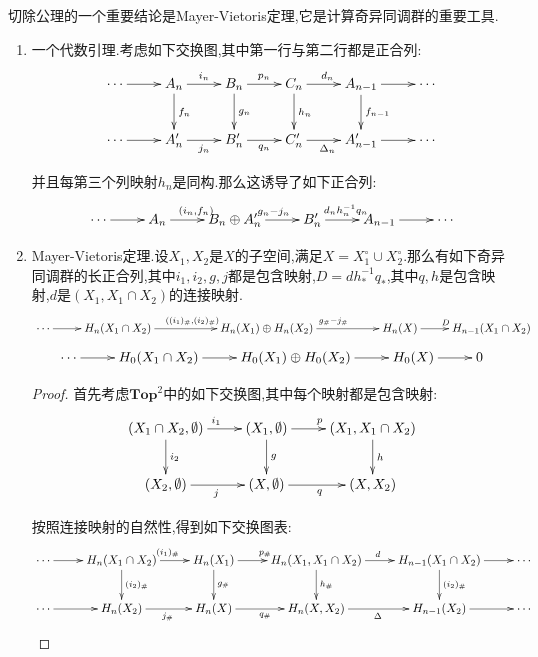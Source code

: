 切除公理的一个重要结论是Mayer-Vietoris定理,它是计算奇异同调群的重要工具.
\begin{enumerate}
	\item 一个代数引理.考虑如下交换图,其中第一行与第二行都是正合列:
	$$\xymatrix{\cdots\ar[r]&A_n\ar[r]^{i_n}\ar[d]^{f_n}&B_n\ar[r]^{p_n}\ar[d]^{g_n}&C_n\ar[r]^{d_n}\ar[d]^{h_n}&A_{n-1}\ar[r]\ar[d]^{f_{n-1}}&\cdots\\\cdots\ar[r]&A_n'\ar[r]_{j_n}&B_n'\ar[r]_{q_n}&C_n'\ar[r]_{\Delta_n}&A_{n-1}'\ar[r]&\cdots}$$
	
	并且每第三个列映射$h_n$是同构.那么这诱导了如下正合列:
	$$\xymatrix{\cdots\ar[r]&A_n\ar[r]^{(i_n,f_n)}&B_n\oplus A_n'\ar[r]^{g_n-j_n}&B_n'\ar[r]^{d_nh_n^{-1}q_n}&A_{n-1}\ar[r]&\cdots}$$
	\item Mayer-Vietoris定理.设$X_1,X_2$是$X$的子空间,满足$X=X_1^{\circ}\cup X_2^{\circ}$.那么有如下奇异同调群的长正合列,其中$i_1,i_2,g,j$都是包含映射,$D=dh_*^{-1}q_*$,其中$q,h$是包含映射,$d$是$(X_1,X_1\cap X_2)$的连接映射.
	$$\xymatrix{\cdots\ar[r]&H_n(X_1\cap X_2)\ar[rr]^{((i_1)_{\#},(i_2)_{\#})}&&H_n(X_1)\oplus H_n(X_2)\ar[rr]^{g_{\#}-j_{\#}}&&H_n(X)\ar[r]^D&H_{n-1}(X_1\cap X_2)}$$
	$$\xymatrix{\cdots\ar[r]&H_0(X_1\cap X_2)\ar[r]&H_0(X_1)\oplus H_0(X_2)\ar[r]&H_0(X)\ar[r]&0}$$
	\begin{proof}
		
		首先考虑$\textbf{Top}^2$中的如下交换图,其中每个映射都是包含映射:
		$$\xymatrix{(X_1\cap X_2,\emptyset)\ar[r]^{i_1}\ar[d]^{i_2}&(X_1,\emptyset)\ar[r]^p\ar[d]^g&(X_1,X_1\cap X_2)\ar[d]^h\\(X_2,\emptyset)\ar[r]_j&(X,\emptyset)\ar[r]_q&(X,X_2)}$$
		
		按照连接映射的自然性,得到如下交换图表:
		$$\xymatrix{\cdots\ar[r]&H_n(X_1\cap X_2)\ar[r]^{(i_1)_{\#}}\ar[d]^{(i_2)_{\#}}&H_n(X_1)\ar[r]^{p_{\#}}\ar[d]^{g_{\#}}&H_n(X_1,X_1\cap X_2)\ar[r]^d\ar[d]^{h_{\#}}&H_{n-1}(X_1\cap X_2)\ar[r]\ar[d]^{(i_2)_{\#}}&\cdots\\\cdots\ar[r]&H_n(X_2)\ar[r]_{j_{\#}}&H_n(X)\ar[r]_{q_{\#}}&H_n(X,X_2)\ar[r]_{\Delta}&H_{n-1}(X_2)\ar[r]&\cdots}$$
		

\end{proof}
\end{enumerate}

